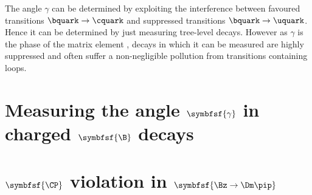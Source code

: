The angle $\gamma$ can be determined by exploiting the interference between favoured transitions $\bquark\to\cquark$ and suppressed transitions $\bquark\to\uquark$.
Hence it can be determined by just measuring tree-level decays.
However as $\gamma$ is the phase of the matrix element \Vub, decays in which it can be measured are highly suppressed and often suffer a non-negligible pollution from transitions containing loops.


\section[head={Measuring the angle $\gamma$ in charged \B decays},tocentry={Measuring the angle $\gamma$ in charged \B decays}]{Measuring the angle $\symbfsf{\gamma}$ in charged $\symbfsf{\B}$ decays}
\label{sec:gammainChargedModes}

\Blindtext

\section[head={\CP violation in $\Bz\to\Dm\pip$},tocentry={\CP violation in $\Bz\to\Dm\pip$}]{$\symbfsf{\CP}$ violation in $\symbfsf{\Bz\to\Dm\pip}$}
\label{sec:cpvInBd2Dpi}

